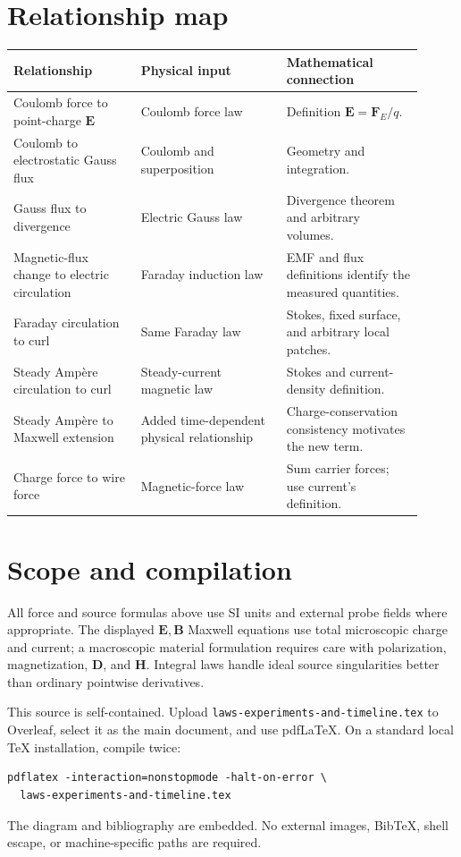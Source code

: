 \documentclass[11pt,letterpaper]{article}
\newcommand{\vect}[1]{\boldsymbol{#1}}
\begin{document}
\section*{Relationship map}
\begin{tabular}{P{0.29\linewidth}P{0.32\linewidth}P{0.30\linewidth}}
\toprule
Relationship & Physical input & Mathematical connection\\\midrule
Coulomb force to point-charge $\vect E$ & Coulomb force law & Definition $\vect E=\vect F_E/q$.\\
Coulomb to electrostatic Gauss flux & Coulomb and superposition & Geometry and integration.\\
Gauss flux to divergence & Electric Gauss law & Divergence theorem and arbitrary volumes.\\
Magnetic-flux change to electric circulation & Faraday induction law & EMF and flux definitions identify the measured quantities.\\
Faraday circulation to curl & Same Faraday law & Stokes, fixed surface, and arbitrary local patches.\\
Steady Amp\`ere circulation to curl & Steady-current magnetic law & Stokes and current-density definition.\\
Steady Amp\`ere to Maxwell extension & Added time-dependent physical relationship & Charge-conservation consistency motivates the new term.\\
Charge force to wire force & Magnetic-force law & Sum carrier forces; use current's definition.\\\bottomrule
\end{tabular}

\section*{Scope and compilation}
All force and source formulas above use SI units and external probe fields where appropriate. The displayed $\vect E,\vect B$ Maxwell equations use total microscopic charge and current; a macroscopic material formulation requires care with polarization, magnetization, $\vect D$, and $\vect H$. Integral laws handle ideal source singularities better than ordinary pointwise derivatives.

This source is self-contained. Upload \texttt{laws-experiments-and-timeline.tex} to Overleaf, select it as the main document, and use pdfLaTeX. On a standard local TeX installation, compile twice:
\begin{verbatim}
pdflatex -interaction=nonstopmode -halt-on-error \
  laws-experiments-and-timeline.tex
\end{verbatim}
The diagram and bibliography are embedded. No external images, BibTeX, shell escape, or machine-specific paths are required.
\end{document}
